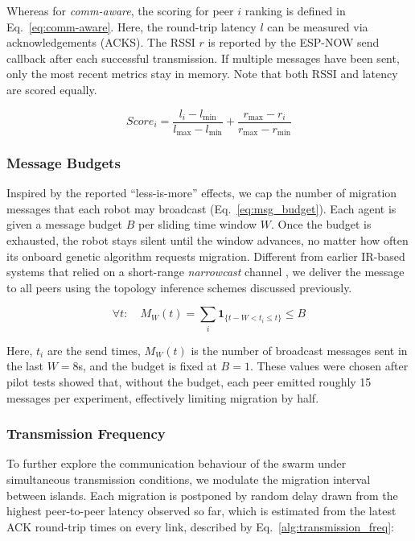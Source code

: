 \documentclass[conference]{IEEEtran}
\begin{document}
Whereas for \emph{comm-aware}, the scoring for peer $i$ ranking is defined in Eq.~\ref{eq:comm-aware}. Here, the round-trip latency $l$ can be measured via acknowledgements (ACKS). The RSSI $r$ is reported by the ESP-NOW send callback after each successful transmission. If multiple messages have been sent, only the most recent metrics stay in memory. Note that both RSSI and latency are scored equally.

\begin{equation}\label{eq:comm-aware}
Score_i =
\frac{l_i - l_{\min}}{l_{\max} - l_{\min}} +
\frac{r_{\max} - r_i}{r_{\max} - r_{\min}}
\end{equation}

\subsubsection{Message Budgets}\label{sec:limited-rate}

Inspired by the reported “less-is-more” effects, we cap the number of migration messages that each robot may broadcast (Eq.~\ref{eq:msg_budget}). Each agent is given a message budget $B$ per sliding time window $W$. Once the budget is exhausted, the robot stays silent until the window advances, no matter how often its onboard genetic algorithm requests migration.  Different from earlier IR-based systems that relied on a short-range \emph{narrowcast} channel \cite{aust_hidden_2022}, we deliver the message to all peers using the topology inference schemes discussed previously.

\begin{equation}\label{eq:msg_budget}
\forall t:\quad M_W(t)=\sum_{i}\mathbf{1}_{\{t-W< t_i \le t\}} \le B
\end{equation}

Here, $t_i$ are the send times, $M_W(t)$ is the number of broadcast messages sent in the last $W=8$s, and the budget is fixed at $B=1$. These values were chosen after pilot tests showed that, without the budget, each peer emitted roughly 15 messages per experiment, effectively limiting migration by half. \\

\subsubsection{Transmission Frequency}\label{sec:transmission-frequency}

To further explore the communication behaviour of the swarm under simultaneous transmission conditions, we modulate the migration interval between islands. Each migration is postponed by random delay drawn from the highest peer-to-peer latency observed so far, which is estimated from the latest ACK round-trip times on every link, described by Eq.~\ref{alg:transmission_freq}:
\end{document}
